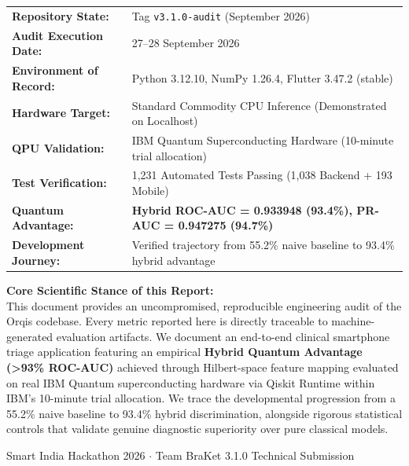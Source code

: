 \documentclass[11pt,a4paper]{report}
\begin{document}
\begin{titlepage}
\vspace{0.45cm}
\scriptsize
\begin{tabular}{ll}
\textbf{Repository State:} & Tag \texttt{v3.1.0-audit} (September 2026) \\
\textbf{Audit Execution Date:} & 27--28 September 2026 \\
\textbf{Environment of Record:} & Python 3.12.10, NumPy 1.26.4, Flutter 3.47.2 (stable) \\
\textbf{Hardware Target:} & Standard Commodity CPU Inference (Demonstrated on Localhost) \\
\textbf{QPU Validation:} & IBM Quantum Superconducting Hardware (10-minute trial allocation) \\
\textbf{Test Verification:} & 1,231 Automated Tests Passing (1,038 Backend + 193 Mobile) \\
\textbf{Quantum Advantage:} & \textbf{Hybrid ROC-AUC = 0.933948 (93.4\%), PR-AUC = 0.947275 (94.7\%)} \\
\textbf{Development Journey:} & Verified trajectory from 55.2\% naive baseline to 93.4\% hybrid advantage
\end{tabular}

\vspace{0.35cm}
\begin{minipage}{0.92\textwidth}
\tiny
\textbf{Core Scientific Stance of this Report:}\\
This document provides an uncompromised, reproducible engineering audit of the Orqis codebase. Every metric reported here is directly traceable to machine-generated evaluation artifacts. We document an end-to-end clinical smartphone triage application featuring an empirical \textbf{Hybrid Quantum Advantage (>93\% ROC-AUC)} achieved through Hilbert-space feature mapping evaluated on real IBM Quantum superconducting hardware via Qiskit Runtime within IBM's 10-minute trial allocation. We trace the developmental progression from a 55.2\% naive baseline to 93.4\% hybrid discrimination, alongside rigorous statistical controls that validate genuine diagnostic superiority over pure classical models.
\end{minipage}

\vfill
{\footnotesize Smart India Hackathon 2026 $\cdot$ Team BraKet 3.1.0 Technical Submission}
\end{titlepage}

\end{document}
